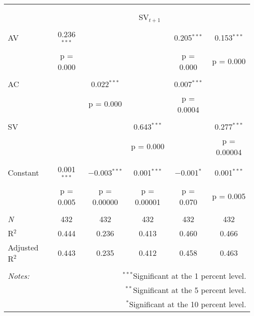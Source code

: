 
\begin{tabular}{@{\extracolsep{5pt}}lccccc} 
\\[-1.8ex]\hline 
\hline \\[-1.8ex] 
\\[-1.8ex] & \multicolumn{5}{c}{SV$_{t+1}$} \\ 
\hline \\[-1.8ex] 
 AV & 0.236$^{***}$ &  &  & 0.205$^{***}$ & 0.153$^{***}$ \\ 
  & p = 0.000 &  &  & p = 0.000 & p = 0.000 \\ 
  & & & & & \\ 
 AC &  & 0.022$^{***}$ &  & 0.007$^{***}$ &  \\ 
  &  & p = 0.000 &  & p = 0.0004 &  \\ 
  & & & & & \\ 
 SV &  &  & 0.643$^{***}$ &  & 0.277$^{***}$ \\ 
  &  &  & p = 0.000 &  & p = 0.00004 \\ 
  & & & & & \\ 
 Constant & 0.001$^{***}$ & $-$0.003$^{***}$ & 0.001$^{***}$ & $-$0.001$^{*}$ & 0.001$^{***}$ \\ 
  & p = 0.005 & p = 0.00000 & p = 0.00001 & p = 0.070 & p = 0.005 \\ 
  & & & & & \\ 
\textit{N} & 432 & 432 & 432 & 432 & 432 \\ 
R$^{2}$ & 0.444 & 0.236 & 0.413 & 0.460 & 0.466 \\ 
Adjusted R$^{2}$ & 0.443 & 0.235 & 0.412 & 0.458 & 0.463 \\ 
\hline 
\hline \\[-1.8ex] 
\textit{Notes:} & \multicolumn{5}{r}{$^{***}$Significant at the 1 percent level.} \\ 
 & \multicolumn{5}{r}{$^{**}$Significant at the 5 percent level.} \\ 
 & \multicolumn{5}{r}{$^{*}$Significant at the 10 percent level.} \\ 
\end{tabular} 
